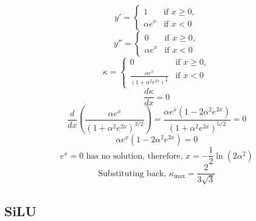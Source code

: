 \documentclass{article}
\begin{document}
 \begin{displaymath}
  y' = \begin{cases}
  1 & \text{if } x \geq 0, \\
  \alpha e^x & \text{if } x < 0
\end{cases}
 \end{displaymath}
\begin{displaymath}
  y'' = \begin{cases}
  0 & \text{if } x \geq 0, \\
  \alpha e^x & \text{if } x < 0
\end{cases}
\end{displaymath}
\begin{displaymath}
  \kappa = \begin{cases}
  0 & \text{if } x \geq 0, \\
  \frac{\alpha e^x}{(1 + \alpha^2 e^{2x})^\frac{3}{2}}  & \text{if } x < 0
\end{cases}
\end{displaymath}
\begin{displaymath}
  \frac{d \kappa}{dx} = 0
\end{displaymath}
\begin{displaymath}
  \frac{d}{dx} \left( \frac{\alpha e^x}{(1 + \alpha^2 e^{2x})^{3/2}} \right)
= \frac{\alpha e^x \left( 1 - 2 \alpha^2 e^{2x} \right)}{(1 + \alpha^2 e^{2x})^{5/2}} = 0
\end{displaymath}
\begin{displaymath}
  \alpha e^x \left( 1 - 2 \alpha^2 e^{2x} \right) = 0
\end{displaymath}
\begin{displaymath}
  e^x = 0 \text{ has no solution} \text{, therefore, } x = -\frac{1}{2} \ln(2 \alpha^2)
\end{displaymath}
\begin{displaymath}
  \text{Substituting back, }\kappa_{\text{max}} = \frac{2}{3\sqrt3}
\end{displaymath}

\subsection{SiLU}\label{app:silu}
\end{document}
